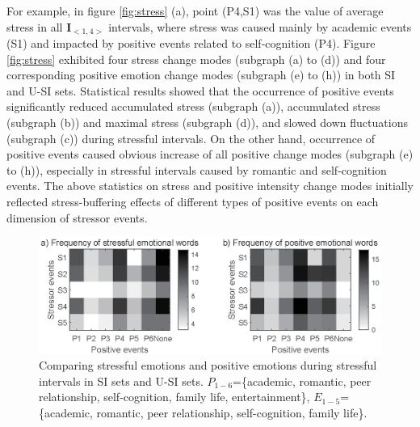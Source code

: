 For example, in figure \ref{fig:stress} (a),
point (P4,S1) was the value of average stress in all $\textbf{I}_{<1,4>}$ intervals,
where stress was caused mainly by academic events (S1) and impacted by positive events related to self-cognition (P4).
Figure \ref{fig:stress} exhibited four stress change modes (subgraph (a) to (d))
and four corresponding positive emotion change modes (subgraph (e) to (h)) in both SI and U-SI sets.
Statistical results showed that the occurrence of positive events significantly
reduced accumulated stress (subgraph (a)), accumulated stress (subgraph (b)) and maximal stress (subgraph (d)),
and slowed down fluctuations (subgraph (c)) during stressful intervals.
On the other hand,
occurrence of positive events caused obvious increase of all positive change modes (subgraph (e) to (h)),
especially in stressful intervals caused by romantic and self-cognition events.
The above statistics on stress and positive intensity change modes
initially reflected stress-buffering effects of different types of positive events on each dimension of stressor events.

\begin{figure}[h]
\centering
\includegraphics[width=\linewidth]{figs/gray/emotion.eps}
\caption{\small{Comparing stressful emotions and positive emotions during stressful intervals in SI sets and U-SI sets.
$P_{1-6}$=\{academic, romantic, peer relationship, self-cognition, family life, entertainment\},
$E_{1-5}$=\{academic, romantic, peer relationship, self-cognition, family life\}.
}}
\label{fig:topicAll}
\end{figure}

